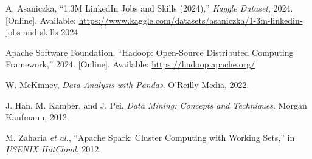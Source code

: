 \documentclass[conference]{IEEEtran}
\begin{document}
\begin{thebibliography}{00}

A. Asaniczka, “1.3M LinkedIn Jobs and Skills (2024),” \textit{Kaggle Dataset}, 2024. [Online]. Available: \url{https://www.kaggle.com/datasets/asaniczka/1-3m-linkedin-jobs-and-skills-2024}

Apache Software Foundation, “Hadoop: Open-Source Distributed Computing Framework,” 2024. [Online]. Available: \url{https://hadoop.apache.org/}

W. McKinney, \textit{Data Analysis with Pandas}. O’Reilly Media, 2022.

J. Han, M. Kamber, and J. Pei, \textit{Data Mining: Concepts and Techniques}. Morgan Kaufmann, 2012.

M. Zaharia \textit{et al.}, “Apache Spark: Cluster Computing with Working Sets,” in \textit{USENIX HotCloud}, 2012.

\end{thebibliography}
\end{document}

